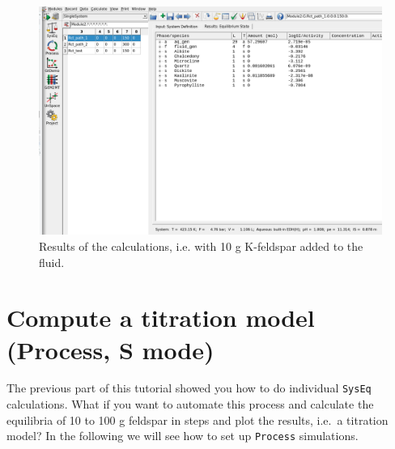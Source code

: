 \documentclass[
]{book}
\begin{document}
\begin{figure}
\includegraphics[width=0.9\linewidth]{figures/module2/fig-4} \caption{Results of the calculations, i.e. with 10 g K-feldspar added to the fluid.}\label{fig:fig-4b}
\end{figure}

\hypertarget{compute-a-titration-model-process-s-mode}{%
\section{Compute a titration model (Process, S mode)}\label{compute-a-titration-model-process-s-mode}}

The previous part of this tutorial showed you how to do individual \texttt{SysEq} calculations. What if you want to automate this process and calculate the equilibria of 10 to 100 g feldspar in steps and plot the results, i.e.~a titration model? In the following we will see how to set up \texttt{Process} simulations.
\end{document}
